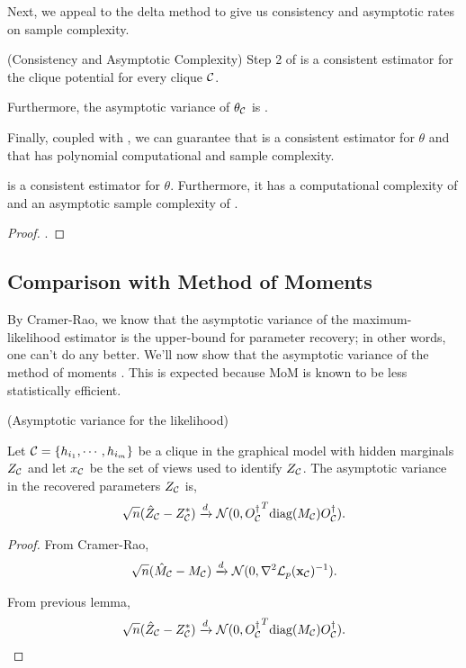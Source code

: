 Next, we appeal to the delta method to give us
  consistency and asymptotic rates on sample complexity.
\begin{corollary}(Consistency and Asymptotic Complexity)
  \label{cor:asymptotics}
  Step 2 of  is a consistent estimator for
  the clique potential for every clique $\mathcal{C}$.

  Furthermore, the asymptotic variance of $\theta_{\mathcal{C}}$ is
  .
\end{corollary}

Finally, coupled with , we can guarantee that
   is a consistent estimator for $\theta$ and 
  that has polynomial computational and sample complexity.
\begin{theorem}
   is a consistent estimator for $\theta$.
  Furthermore, it has a computational complexity of  and an
    asymptotic sample complexity of .
\end{theorem}
\begin{proof}
  .
\end{proof}

\subsection{Comparison with Method of Moments}

By Cramer-Rao, we know that the asymptotic variance of the
  maximum-likelihood estimator is the upper-bound for parameter
  recovery; in other words, one can't do any better. 
  We'll now show that the asymptotic variance of the method of moments . 
This is expected because MoM is known to be less statistically efficient.

\begin{lemma}(Asymptotic variance for the likelihood)
  \label{lem:pw-variance}

  Let $\mathcal{C} = \{h_{i_1}, \cdots, h_{i_m}\}$ be a clique in the graphical
    model with hidden marginals $Z_{\mathcal{C}}$ and
  let $x_{\mathcal{C}}$ be the set of views used to identify $Z_{\mathcal{C}}$.
  The asymptotic variance in the recovered parameters $Z_{\mathcal{C}}$ is,
  \begin{align*}
    \sqrt{n}(\hat Z_{\mathcal{C}} - Z_{\mathcal{C}}^*) \xrightarrow{d} \mathcal{N}( 0, {{O}^{\dagger}_{\mathcal{C}}}^T \textrm{diag}(M_{\mathcal{C}}) {O}^{\dagger}_{\mathcal{C}} ).
  \end{align*}
\end{lemma}
\begin{proof}
  From Cramer-Rao,
  \begin{align*}
    \sqrt{n}(\hat M_{\mathcal{C}} - M_{\mathcal{C}}) \xrightarrow{d} \mathcal{N}( 0, \nabla^2 \mathcal{L}_p(\mathbf{x}_{\mathcal{C}})^{-1} ).
  \end{align*}

  From previous lemma,
  \begin{align*}
    \sqrt{n}(\hat Z_{\mathcal{C}} - Z_{\mathcal{C}}^*) \xrightarrow{d} \mathcal{N}( 0, {{O}^{\dagger}_{\mathcal{C}}}^T \textrm{diag}(M_{\mathcal{C}}) {O}^{\dagger}_{\mathcal{C}} ).
  \end{align*}
\end{proof}

